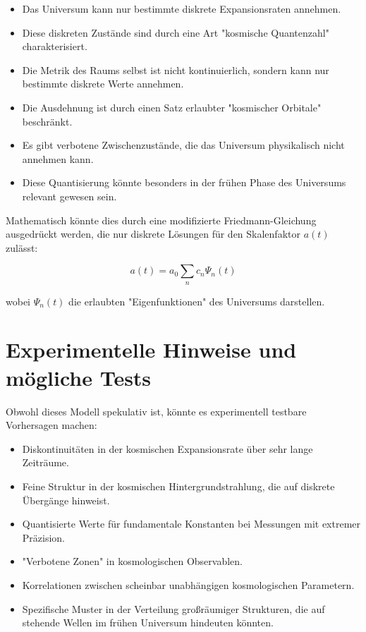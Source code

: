 \documentclass[12pt,a4paper]{article}
\begin{document}
	\begin{itemize}
		\item Das Universum kann nur bestimmte diskrete Expansionsraten annehmen.
		\item Diese diskreten Zustände sind durch eine Art "kosmische Quantenzahl" charakterisiert.
		\item Die Metrik des Raums selbst ist nicht kontinuierlich, sondern kann nur bestimmte diskrete Werte annehmen.
		\item Die Ausdehnung ist durch einen Satz erlaubter "kosmischer Orbitale" beschränkt.
		\item Es gibt verbotene Zwischenzustände, die das Universum physikalisch nicht annehmen kann.
		\item Diese Quantisierung könnte besonders in der frühen Phase des Universums relevant gewesen sein.
	\end{itemize}
	
	Mathematisch könnte dies durch eine modifizierte Friedmann-Gleichung ausgedrückt werden, die nur diskrete Lösungen für den Skalenfaktor $a(t)$ zulässt:
	
	\begin{equation}
		a(t) = a_0 \sum_n c_n \Psi_n(t)
	\end{equation}
	
	wobei $\Psi_n(t)$ die erlaubten "Eigenfunktionen" des Universums darstellen.
	
	\section{Experimentelle Hinweise und mögliche Tests}
	
	Obwohl dieses Modell spekulativ ist, könnte es experimentell testbare Vorhersagen machen:
	
	\begin{itemize}
		\item Diskontinuitäten in der kosmischen Expansionsrate über sehr lange Zeiträume.
		\item Feine Struktur in der kosmischen Hintergrundstrahlung, die auf diskrete Übergänge hinweist.
		\item Quantisierte Werte für fundamentale Konstanten bei Messungen mit extremer Präzision.
		\item "Verbotene Zonen" in kosmologischen Observablen.
		\item Korrelationen zwischen scheinbar unabhängigen kosmologischen Parametern.
		\item Spezifische Muster in der Verteilung großräumiger Strukturen, die auf stehende Wellen im frühen Universum hindeuten könnten.
	\end{itemize}
	
\end{document}
